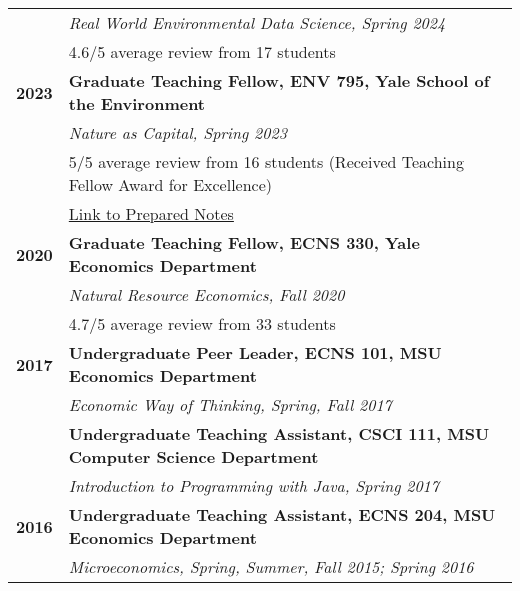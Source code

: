 \documentclass[11pt]{article}
\begin{document}
\begin{longtable}{>{\bfseries}r p{5.5in}}
    & \textit{Real World Environmental Data Science, Spring 2024} \\
    & 4.6/5 average review from 17 students \\
2023 & \textbf{Graduate Teaching Fellow, ENV 795, Yale School of the Environment} \\
    & \textit{Nature as Capital, Spring 2023} \\
    & 5/5 average review from 16 students (Received Teaching Fellow Award for Excellence)\\
    & \href{https://github.com/a5creel/nature_as_capital}{Link to Prepared Notes} \\[1ex]
2020 & \textbf{Graduate Teaching Fellow, ECNS 330, Yale Economics Department} \\
    & \textit{Natural Resource Economics, Fall 2020} \\
    & 4.7/5 average review from 33 students \\[1ex]
2017 & \textbf{Undergraduate Peer Leader, ECNS 101, MSU Economics Department} \\
    & \textit{Economic Way of Thinking, Spring, Fall 2017} \\[1ex]
    & \textbf{Undergraduate Teaching Assistant, CSCI 111, MSU Computer Science Department} \\
    & \textit{Introduction to Programming with Java, Spring 2017} \\[1ex]
2016 & \textbf{Undergraduate Teaching Assistant, ECNS 204, MSU Economics Department} \\
    & \textit{Microeconomics, Spring, Summer, Fall 2015; Spring 2016} \\
\end{longtable}
\end{document}

